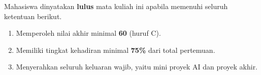 Mahasiswa dinyatakan \textbf{lulus} mata kuliah ini apabila memenuhi seluruh
ketentuan berikut.

\begin{enumerate}
  \item Memperoleh nilai akhir minimal \textbf{60} (huruf C).
  \item Memiliki tingkat kehadiran minimal \textbf{75\%} dari total pertemuan.
  \item Menyerahkan seluruh keluaran wajib, yaitu mini proyek AI dan proyek akhir.
\end{enumerate}
